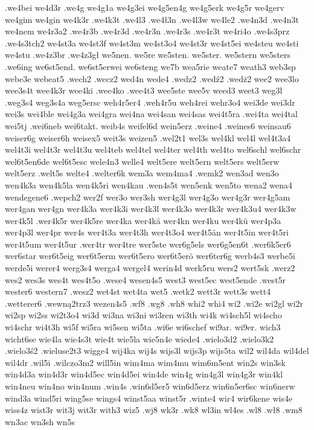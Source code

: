 {{.we4bei
we4d3r
.we4g
we4g1a
we4g3ei
we4g5en4g
we4g5erk
we4g5r
we4gerv
we4gim
we4gin
we4k3r
.we4k3t
.we4l3
.we4ł3n
.we4l3w
we4le2
.we4n3d
.we4n3t
we4nem
we4r3a2
.we4r3b
.we4r3d
.we4r3n
.we4r3s
.we4r3t
we4ri4o
.we4s3prz
.we4s3tch2
we4st3a
we4st3f
we4st3m
we4st3o4
we4st3r
we4st5ei
we4steu
we4sti
we4stu
.we4z3br
.we4z3gł
we5nen.
we5re
we5sten.
we5ster.
we5stern
we5sters
.we6ing
we6st5end.
we6st5erwei
we6steng
we7b
wea5rie
weate7
weath3
web3sp
webe3e
webeat5
.wech2
.wecz2
wed4n
wede4
.wedz2
.wedź2
.wedż2
wee2
wee3lo
wee3s4t
wee4k3r
wee4ki
.wee4ko
.wee4t3
wee5ste
wee5v
weed3
weet3
weg3l
.weg3s4
weg3s4a
weg5ersc
weh4r5er4
.weh4r5u
weh4rei
wehr3o4
wei3de
wei3dr
wei3s
wei4ble
wei4g3a
wei4gra
wei4na
wei4san
wei4sas
wei4t5ra
.wei4ta
wei4tal
wei5tj
.wei6neb
wei6takt.
weib4s
weifel6d
wein5erz
.weine4
.weines6
weinsau6
weiser6g
weiser6h
weisex5
weit3s
weizen5
.wel2t1
wel3s
wel4kl
wel4l
wel4t3a4
wel4t3i
wel4t3r
wel4t3u
wel4teb
wel4tel
wel4ter
wel4th
wel4to
wel6schl
wel6schr
wel6t5en6de
wel6t5esc
wele4n3
welle4
welt5ere
welt5ern
welt5ers
welt5erw
welt5erz
.welt5s
welte4
.welter6k
wem3a
wem4ma4
.wemk2
wen3ad
wen3o
wen4k3a
wen4k5la
wen4k5ri
wen4kau
.wen4s5t
wen5enk
wen5to
wena2
wena4
wendegene6
.wepch2
wer2f
wer3o
wer3sh
wer4g3l
wer4g3o
wer4g3r
wer4g5am
wer4gan
wer4gn
wer4k3a
wer4k3i
wer4k3l
wer4k3o
wer4k3r
wer4k3u4
wer4k3w
wer4k5l
.wer4k5r
wer4k5re
wer4ka
wer4kä
wer4kn
wer4ku
wer4kü
wer4p3a
wer4p3l
wer4pr
wer4s
wer4t3a
wer4t3h
wer4t3o4
wer4t5än
wer4t5in
wer4t5ri
wer4t5um
wer4t5ur
.wer4tr
wer4tre
wer5ste
wer6g5els
wer6g5en6t
.wer6k5er6
wer6star
wer6t5eig
wer6t5erm
wer6t5ero
wer6t5erö
wer6ter6g
werb4s3
werbe5i
werde5i
werer4
werg3s4
werga4
wergel4
werin4d
werk5ru
wers2
wert5sk
.werz2
wes2
wes3s
wes4t
wes4t5o
.wese4
wesen4s5
west3
west5ec
west5ende
.west5r
wester6
western7
.wesz2
wet4st
wet4ta
wet5
.wetk2
wett3r
wett3s
wett4
.wetterer6
.wewną2trz3
wezen4s5
.wf8
.wg8
.wh8
whi2
whi4
wi2
.wi2e
wi2gl
wi2r
wi2sp
wi2ss
wi2t3o4
wi3d
wi3na
wi3ni
wi3ren
wi3th
wi4k
wi4sch5l
wi4scho
wi4schr
wi4t3h
wi5f
wi5ra
wi5sen
wi5ta
.wi6e
wi6schef
wi9ar.
wi9er.
wich3
wicht6se
wie4la
wie4s3t
wie4t
wie5la
wie5n4e
wiede4
.wielo3d2
.wielo3k2
.wielo3ś2
.wieluse2t3
wigge4
wij4ka
wij4s
wijs3l
wijs3p
wijs5ta
wil2
wil4da
wil4del
wil4dr
.wil5i
.wilczo3m2
will5in
wim4ma
wim4mu
wim6m5ent
win2s
win3sk
win4d3a
win4d3r
win4d5ec
win4d5ei
win4de
win4g
win4g3l
win4g3r
win4kl
win4neu
win4no
win4num
.win4s
.win6d5er5
win6d5erz
win6n5er6sc
win6nerw
wind3a
wind5ri
wing5se
wings4
winst5aa
winst5r
.winte4
wir4
wir6kene
wis4e
wiss4z
wist3r
wit3j
wit3r
with3
wiz5
.wj8
wk3r
.wk8
wl3in
wl4es
.wl8
.wł8
.wm8
wn3ac
wn3sh
wn5s
}}
